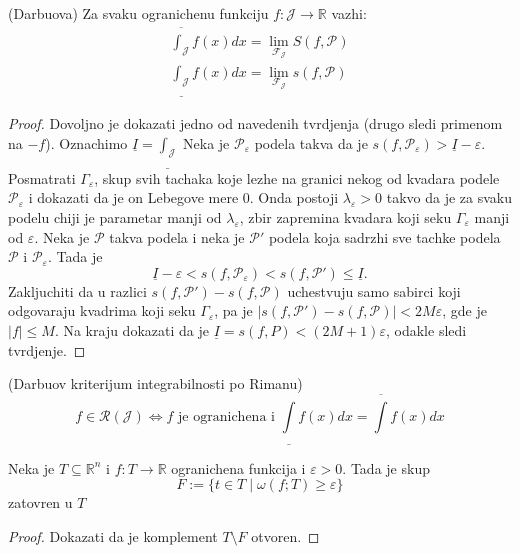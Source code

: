 \documentclass[a4paper,12pt]{article}
\newcommand{\f}{\mathscr{F}}
\newcommand{\RR}{\mathbb{R}}
\newcommand{\eps}{\varepsilon}
\newcommand{\psj}{\subseteq}
\begin{document}
\begin{tma}(Darbuova)
	Za svaku ogranichenu funkciju $f:\mathcal J \to \RR$ vazhi:
	\begin{align*}
		\overline{\int_{\mathcal J}}f(x)dx = \lim_{\f _{\mathcal J}} S(f, \mathcal P)\\
		\underline{\int_{\mathcal J}}f(x)dx = \lim_{\f _{\mathcal J}} s(f, \mathcal P)
	\end{align*}
\end{tma}
\begin{proof}
	Dovoljno je dokazati jedno od navedenih tvrdjenja (drugo sledi primenom na $-f$). Oznachimo $\underline I = \underline{\int_{\mathcal J}}$
	Neka je $\mathcal P_\eps$ podela takva da je $s(f, \mathcal P _\eps) > \underline I - \eps$. Posmatrati $\Gamma_\eps$, skup 
	svih tachaka koje lezhe na granici nekog od kvadara podele $\mathcal P_\eps$ i dokazati da je on Lebegove mere 0.
	Onda postoji $\lambda_\eps > 0$ takvo da je za svaku podelu chiji je parametar manji od $\lambda_\eps$, zbir zapremina
	kvadara koji seku $\Gamma_\eps$ manji od $\eps$. Neka je $\mathcal P$ takva podela i neka je $\mathcal P'$ podela koja
	sadrzhi sve tachke podela $\mathcal P$ i $\mathcal P_\eps$. Tada je 
	\[ \underline I - \eps < s(f, \mathcal P_\eps) < s(f, \mathcal P') \leq \underline I .\] 
	Zakljuchiti da u razlici $s(f, \mathcal P') - s(f,\mathcal P)$ uchestvuju samo sabirci koji odgovaraju kvadrima koji
	seku $\Gamma_\eps$, pa je $|s(f, \mathcal P') - s(f,\mathcal P)| < 2M\eps$, gde je $|f| \leq M$. Na kraju dokazati da 
	je $\underline I = s(f, P) < (2M+1)\eps$, odakle sledi tvrdjenje.
\end{proof}

\begin{posl}(Darbuov kriterijum integrabilnosti po Rimanu)
	\[ f \in \mathcal R(\mathcal J) \iff f \text{ je ogranichena i } \underline \int f(x)dx = \overline \int f(x)dx\] 
\end{posl}

\begin{lema}
	Neka je $T\psj \RR^n$ i $f:T \to\RR$ ogranichena funkcija i $\eps > 0$. Tada je skup
	$$F:=\{t \in T \mid \omega(f; T) \geq \eps\}$$
	zatovren u $T$
\end{lema}
\begin{proof}
	Dokazati da je komplement $T\setminus F$ otvoren.
\end{proof}
\end{document}

